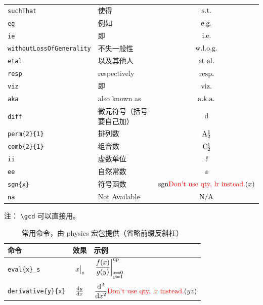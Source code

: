 \documentclass{MMCStyle}
\begin{document}
\begin{table}[!htbp]
\begin{tabularx}{0.8\textwidth}{lYc}
\lstinline|suchThat| & 使得 & $\suchThat$ \\
\lstinline|eg| & 例如 & $\eg$ \\
\lstinline|ie| & 即 & $\ie$ \\
\lstinline|withoutLossOfGenerality| & 不失一般性 & $\withoutLossOfGenerality$ \\
\lstinline|etal| & 以及其他人 & $\etal$ \\
\lstinline|resp| & respectively & $\resp$ \\
\lstinline|viz| & 即 & $\viz$ \\
\lstinline|aka| & also known as & $\aka$ \\
\lstinline|diff| & 微元符号（括号要自己加） & $\diff{}$ \\
\lstinline|perm{2}{1}| & 排列数 & $\perm{2}{1}$ \\
\lstinline|comb{2}{1}| & 组合数 & $\comb{2}{1}$ \\
\lstinline|ii| & 虚数单位 & $\ii$ \\
\lstinline|ee| & 自然常数 & $\ee$ \\
\lstinline|sgn{x}| & 符号函数 & $\sgn{x}$ \\
\lstinline|na| & Not Available & $\na$ \\
\bottomrule
\end{tabularx}
\end{table}

注： \verb|\gcd| 可以直接用。

\begin{table}
\centering
\caption{常用命令，由 physics 宏包提供（省略前缀反斜杠）}
\begin{tabularx}{0.8\textwidth}{lcY}
\toprule
\textbf{命令} & \textbf{效果} & \textbf{示例} \\
\midrule
\lstinline|eval{x}_s| & $\eval{x}_s$ & $\eval{\dfrac{f(x)}{g(y)}}_{\substack{
  x = 0 \\
  y = 1
}}^{\mathrm{up}}$ \\
\lstinline|derivative{y}{x}| & $\derivative{y}{x}$ & $\displaystyle\dv[2]{}{x}\lr(y z)$ \\
\bottomrule
\end{tabularx}
\end{table}
\end{document}

